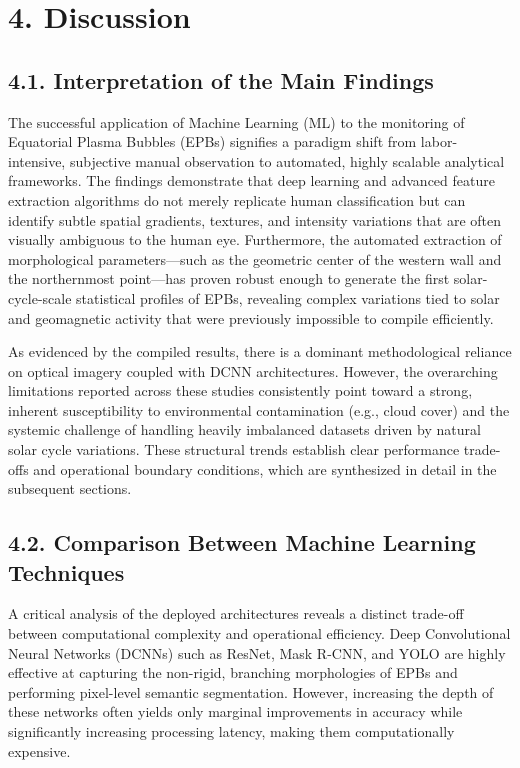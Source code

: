 \hypertarget{discussion}{%
\section{4. Discussion}\label{discussion}}

\hypertarget{interpretation-of-the-main-findings}{%
\subsection{4.1. Interpretation of the Main
Findings}\label{interpretation-of-the-main-findings}}

The successful application of Machine Learning (ML) to the monitoring of
Equatorial Plasma Bubbles (EPBs) signifies a paradigm shift from
labor-intensive, subjective manual observation to automated, highly
scalable analytical frameworks. The findings demonstrate that deep
learning and advanced feature extraction algorithms do not merely
replicate human classification but can identify subtle spatial
gradients, textures, and intensity variations that are often visually
ambiguous to the human eye. Furthermore, the automated extraction of
morphological parameters---such as the geometric center of the western
wall and the northernmost point---has proven robust enough to generate
the first solar-cycle-scale statistical profiles of EPBs, revealing
complex variations tied to solar and geomagnetic activity that were
previously impossible to compile efficiently.

As evidenced by the compiled results, there is a dominant methodological
reliance on optical imagery coupled with DCNN architectures. However,
the overarching limitations reported across these studies consistently
point toward a strong, inherent susceptibility to environmental
contamination (e.g., cloud cover) and the systemic challenge of handling
heavily imbalanced datasets driven by natural solar cycle variations.
These structural trends establish clear performance trade-offs and
operational boundary conditions, which are synthesized in detail in the
subsequent sections.

\hypertarget{comparison-between-machine-learning-techniques}{%
\subsection{4.2. Comparison Between Machine Learning
Techniques}\label{comparison-between-machine-learning-techniques}}

A critical analysis of the deployed architectures reveals a distinct
trade-off between computational complexity and operational efficiency.
Deep Convolutional Neural Networks (DCNNs) such as ResNet, Mask R-CNN,
and YOLO are highly effective at capturing the non-rigid, branching
morphologies of EPBs and performing pixel-level semantic segmentation.
However, increasing the depth of these networks often yields only
marginal improvements in accuracy while significantly increasing
processing latency, making them computationally expensive.


